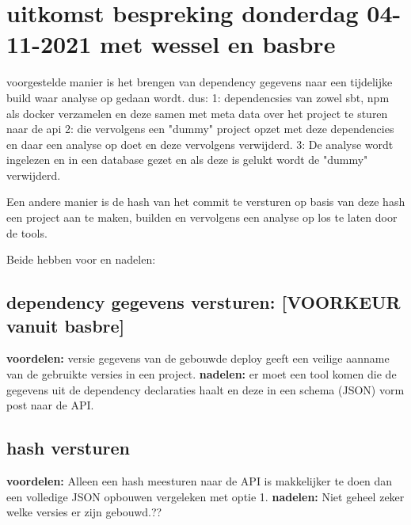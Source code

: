 \section{uitkomst bespreking donderdag 04-11-2021 met wessel en basbre}

voorgestelde manier is het brengen van dependency gegevens naar een tijdelijke build waar analyse op gedaan wordt. dus: 1: dependencsies van zowel sbt, npm als docker verzamelen en deze samen met meta data over het project te sturen naar de api  2: die vervolgens een "dummy" project opzet met deze dependencies en daar een analyse op doet en deze vervolgens verwijderd. 3: De analyse wordt ingelezen en in een database gezet en als deze is gelukt wordt de "dummy" verwijderd.

Een andere manier is de hash van het commit te versturen op basis van deze hash een project aan te maken, builden en vervolgens een analyse op los te laten door de tools.

Beide hebben voor en nadelen:

\subsection{dependency gegevens versturen: [VOORKEUR vanuit basbre]}
\textbf{voordelen:}
versie gegevens van de gebouwde deploy geeft een veilige aanname van de gebruikte versies in een project.
\textbf{nadelen:}
er moet een tool komen die de gegevens uit de dependency declaraties haalt en deze in een schema (JSON) vorm post naar de API.

\subsection{hash versturen}
\textbf{voordelen:}
Alleen een hash meesturen naar de API is makkelijker te doen dan een volledige JSON opbouwen vergeleken met optie 1.
\textbf{nadelen:}
Niet geheel zeker welke versies er zijn gebouwd.??
